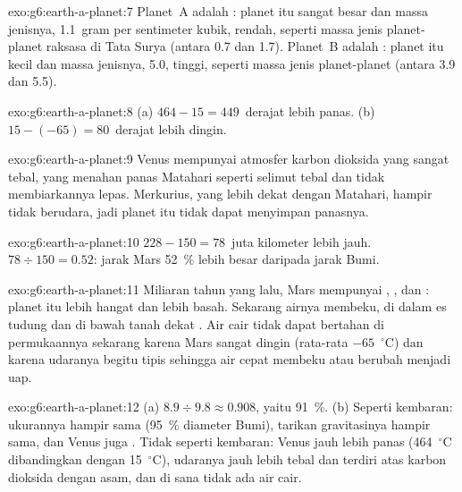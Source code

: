 \begin{solution}{exo:g6:earth-a-planet:7}
Planet~A adalah : planet itu sangat besar dan massa jenisnya,
1.1~gram per sentimeter kubik, rendah, seperti massa jenis planet-planet
raksasa di Tata Surya (antara 0.7 dan 1.7). Planet~B adalah :
planet itu kecil dan massa jenisnya, 5.0, tinggi, seperti massa jenis
planet-planet  (antara 3.9 dan 5.5).
\end{solution}

\begin{solution}{exo:g6:earth-a-planet:8}
(a) $464 - 15 = 449$~derajat lebih panas. (b) $15 - (-65) = 80$~derajat lebih dingin.
\end{solution}

\begin{solution}{exo:g6:earth-a-planet:9}
Venus mempunyai atmosfer karbon dioksida yang sangat tebal, yang menahan
panas Matahari seperti selimut tebal dan tidak membiarkannya lepas.
Merkurius, yang lebih dekat dengan Matahari, hampir tidak berudara, jadi
planet itu tidak dapat menyimpan panasnya.
\end{solution}

\begin{solution}{exo:g6:earth-a-planet:10}
$228 - 150 = 78$~juta kilometer lebih jauh. $78 \div 150 = 0.52$: jarak
Mars 52~\% lebih besar daripada jarak Bumi.
\end{solution}

\begin{solution}{exo:g6:earth-a-planet:11}
Miliaran tahun yang lalu, Mars mempunyai , , dan : planet
itu lebih hangat dan lebih basah. Sekarang airnya membeku, di dalam es
tudung  dan di bawah tanah dekat . Air cair tidak dapat bertahan
di permukaannya sekarang karena Mars sangat dingin (rata-rata
$-65$~$^\circ$C) dan karena udaranya begitu tipis sehingga air cepat
membeku atau berubah menjadi uap.
\end{solution}

\begin{solution}{exo:g6:earth-a-planet:12}
(a) $8.9 \div 9.8 \approx 0.908$, yaitu 91~\%. (b) Seperti kembaran:
ukurannya hampir sama (95~\% diameter Bumi), tarikan gravitasinya hampir
sama, dan Venus juga . Tidak seperti kembaran: Venus jauh lebih
panas (464~$^\circ$C dibandingkan dengan 15~$^\circ$C), udaranya jauh lebih
tebal dan terdiri atas karbon dioksida dengan  asam, dan di sana tidak
ada air cair.
\end{solution}

